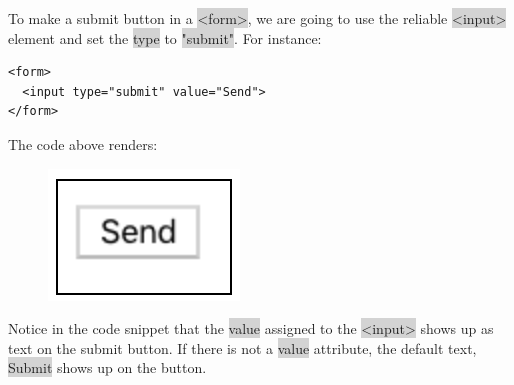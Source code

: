 \documentclass[11pt]{article}
\begin{document}
To make a submit button in a \colorbox{lightgray}{<form>}, we are going to use the reliable \colorbox{lightgray}{<input>} element and set the \colorbox{lightgray}{type} to \colorbox{lightgray}{"submit"}. For instance:
\begin{lstlisting}
<form>
  <input type="submit" value="Send">
</form>
\end{lstlisting}
The code above renders:
\begin{figure}[H]
\includegraphics[scale = 0.7]{3_16}
\centering
\end{figure}
\vspace{-4mm}
Notice in the code snippet that the \colorbox{lightgray}{value} assigned to the \colorbox{lightgray}{<input>} shows up as text on the submit button. If there is not a \colorbox{lightgray}{value} attribute, the default text, \colorbox{lightgray}{Submit} shows up on the button.
\end{document}
